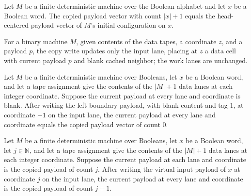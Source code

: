 \begin{lemma}
\label{Complexity.copiedPayload_full}
\leanok
{}
Let $M$ be a finite deterministic machine over the Boolean alphabet and let $x$ be a
Boolean word. The copied payload vector with count $|x|+1$ equals the head-centered
payload vector of $M$'s initial configuration on $x$.
\end{lemma}

\begin{definition}
\label{Complexity.copyDataWrite}
\leanok
{}
For a binary machine $M$, given contents of the data tapes, a coordinate $z$,
and a payload $p$, the copy write updates only the input lane, placing at $z$ a
data cell with current payload $p$ and blank cached neighbor; the work lanes are
unchanged.
\end{definition}

\begin{lemma}
\label{Complexity.copyDataWrite_left}
\leanok
{}
Let $M$ be a finite deterministic machine over Booleans, let $x$ be a Boolean word, and
let a tape assignment give the contents of the $|M|+1$ data lanes at each integer
coordinate. Suppose the current payload at every lane and coordinate is blank. After
writing the left-boundary payload, with blank content and tag $1$, at coordinate $-1$ on
the input lane, the current payload at every lane and coordinate equals the copied
payload vector of count $0$.
\end{lemma}

\begin{lemma}
\label{Complexity.copyDataWrite_next}
\leanok
{}
Let $M$ be a finite deterministic machine over Booleans, let $x$ be a Boolean word, let
$j\in\mathbb{N}$, and let a tape assignment give the contents of the $|M|+1$ data lanes
at each integer coordinate. Suppose the current payload at each lane and coordinate is
the copied payload of count $j$. After writing the virtual input payload of $x$ at
coordinate $j$ on the input lane, the current payload at every lane and coordinate is
the copied payload of count $j+1$.
\end{lemma}

